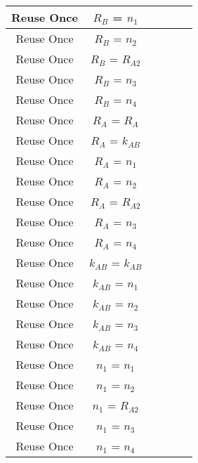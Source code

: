 \documentclass[crop]{standalone}
\newcommand{\noattack}{\color{ForestGreen}\usym{2713}\color{black}}
\newcommand{\attack}{\color{red}\usym{2717}\color{black}}
\begin{document}
{\begin{tabular}{|c|c|c|c|c|c|}
Reuse Once & $R_B$ = $n_1$ & \noattack & \noattack & \noattack & \noattack\\ \hline
Reuse Once & $R_B$ = $n_2$ & \noattack & \noattack & \noattack & \noattack\\ \hline
Reuse Once & $R_B$ = $R_{A2}$ & \noattack & \noattack & \noattack & \noattack\\ \hline
Reuse Once & $R_B$ = $n_3$ & \noattack & \noattack & \noattack & \noattack\\ \hline
Reuse Once & $R_B$ = $n_4$ & \noattack & \noattack & \noattack & \noattack\\ \hline
Reuse Once & $R_A$ = $R_A$ & \noattack & \noattack & \noattack & \noattack\\ \hline
Reuse Once & $R_A$ = $k_{AB}$ & \attack & \attack & \attack & \attack\\ \hline
Reuse Once & $R_A$ = $n_1$ & \noattack & \noattack & \noattack & \noattack\\ \hline
Reuse Once & $R_A$ = $n_2$ & \noattack & \noattack & \noattack & \noattack\\ \hline
Reuse Once & $R_A$ = $R_{A2}$ & \noattack & \noattack & \noattack & \noattack\\ \hline
Reuse Once & $R_A$ = $n_3$ & \noattack & \noattack & \noattack & \noattack\\ \hline
Reuse Once & $R_A$ = $n_4$ & \noattack & \noattack & \noattack & \noattack\\ \hline
Reuse Once & $k_{AB}$ = $k_{AB}$ & \attack & \attack & \attack & \attack\\ \hline
Reuse Once & $k_{AB}$ = $n_1$ & \attack & \attack & \attack & \attack\\ \hline
Reuse Once & $k_{AB}$ = $n_2$ & \attack & \attack & \attack & \attack\\ \hline
Reuse Once & $k_{AB}$ = $n_3$ & \attack & \attack & \attack & \attack\\ \hline
Reuse Once & $k_{AB}$ = $n_4$ & \attack & \attack & \attack & \attack\\ \hline
Reuse Once & $n_1$ = $n_1$ & \noattack & \noattack & \noattack & \noattack\\ \hline
Reuse Once & $n_1$ = $n_2$ & \noattack & \noattack & \noattack & \noattack\\ \hline
Reuse Once & $n_1$ = $R_{A2}$ & \noattack & \noattack & \noattack & \noattack\\ \hline
Reuse Once & $n_1$ = $n_3$ & \noattack & \noattack & \noattack & \noattack\\ \hline
Reuse Once & $n_1$ = $n_4$ & \noattack & \noattack & \noattack & \noattack\\ \hline

\end{tabular}}
\end{document}

